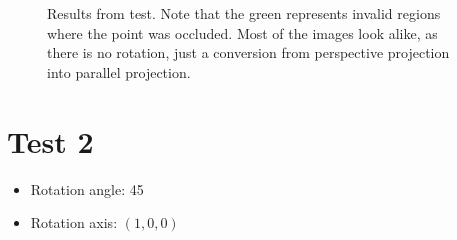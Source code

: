 \documentclass[12pt]{report}
\begin{document}
\begin{figure}[!h]
\hspace{1mm}
\caption{Results from test.  Note that the green represents invalid regions where the point
         was occluded. Most of the images look alike, as there is no rotation, just a conversion
         from perspective projection into parallel projection.}
\end{figure}


\clearpage
\section*{Test 2}

\begin{itemize}
\item[] Rotation angle: 45
\item[] Rotation axis: $(1,0,0)$
\end{itemize}
\end{document}
